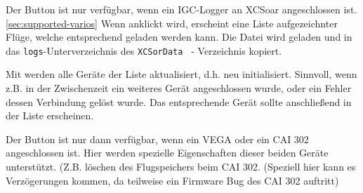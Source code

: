Der Button  ist nur verfügbar, wenn ein IGC-Logger an \textsf{XCSoar} angeschlossen ist.  \ref{sec:supported-varios}
Wenn anklickt wird, erscheint eine Liste aufgezeichnter Flüge, welche entsprechend geladen werden kann.  Die Datei  wird geladen und in das \texttt{logs}-Unterverzeichnis des  \texttt{XCSorData } - Verzeichnis kopiert.

Mit  werden alle Geräte der Liste aktualisiert, d.h. neu initialisiert. Sinnvoll, wenn z.B. in der Zwischenzeit ein weiteres Gerät angeschlossen wurde, oder ein Fehler dessen Verbindung gelöst wurde. Das entsprechende Gerät sollte anschließend in der Liste erscheinen.


Der Button  ist nur dann verfügbar, wenn ein VEGA oder ein CAI 302 angeschlossen ist. Hier werden spezielle Eigenschaften dieser beiden Geräte unterstützt. (Z.B. löschen des Flugspeichers beim CAI 302. (Speziell hier kann es Verzögerungen kommen, da teilweise ein Firmware Bug des CAI 302 auftritt)
